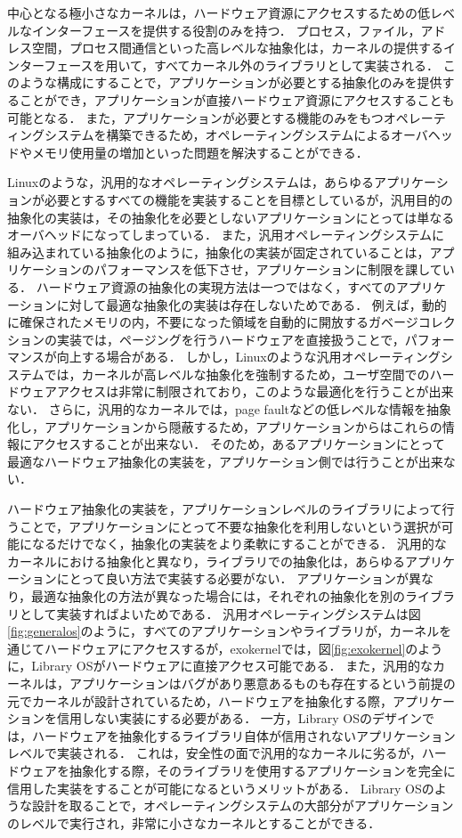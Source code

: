 \documentclass[graduation-thesis]{mlarticle}
\begin{document}
中心となる極小さなカーネルは，ハードウェア資源にアクセスするための低レベルなインターフェースを提供する役割のみを持つ．
プロセス，ファイル，アドレス空間，プロセス間通信といった高レベルな抽象化は，カーネルの提供するインターフェースを用いて，すべてカーネル外のライブラリとして実装される．
このような構成にすることで，アプリケーションが必要とする抽象化のみを提供することができ，アプリケーションが直接ハードウェア資源にアクセスすることも可能となる．
また，アプリケーションが必要とする機能のみをもつオペレーティングシステムを構築できるため，オペレーティングシステムによるオーバヘッドやメモリ使用量の増加といった問題を解決することができる．

Linuxのような，汎用的なオペレーティングシステムは，あらゆるアプリケーションが必要とするすべての機能を実装することを目標としているが，汎用目的の抽象化の実装は，その抽象化を必要としないアプリケーションにとっては単なるオーバヘッドになってしまっている．
また，汎用オペレーティングシステムに組み込まれている抽象化のように，抽象化の実装が固定されていることは，アプリケーションのパフォーマンスを低下させ，アプリケーションに制限を課している．
ハードウェア資源の抽象化の実現方法は一つではなく，すべてのアプリケーションに対して最適な抽象化の実装は存在しないためである．
例えば，動的に確保されたメモリの内，不要になった領域を自動的に開放するガベージコレクションの実装では，ページングを行うハードウェアを直接扱うことで，パフォーマンスが向上する場合がある．
しかし，Linuxのような汎用オペレーティングシステムでは，カーネルが高レベルな抽象化を強制するため，ユーザ空間でのハードウェアアクセスは非常に制限されており，このような最適化を行うことが出来ない．
さらに，汎用的なカーネルでは，page faultなどの低レベルな情報を抽象化し，アプリケーションから隠蔽するため，アプリケーションからはこれらの情報にアクセスすることが出来ない．
そのため，あるアプリケーションにとって最適なハードウェア抽象化の実装を，アプリケーション側では行うことが出来ない．

ハードウェア抽象化の実装を，アプリケーションレベルのライブラリによって行うことで，アプリケーションにとって不要な抽象化を利用しないという選択が可能になるだけでなく，抽象化の実装をより柔軟にすることができる．
汎用的なカーネルにおける抽象化と異なり，ライブラリでの抽象化は，あらゆるアプリケーションにとって良い方法で実装する必要がない．
アプリケーションが異なり，最適な抽象化の方法が異なった場合には，それぞれの抽象化を別のライブラリとして実装すればよいためである．
汎用オペレーティングシステムは図\ref{fig:generalos}のように，すべてのアプリケーションやライブラリが，カーネルを通じてハードウェアにアクセスするが，exokernelでは，図\ref{fig:exokernel}のように，Library OSがハードウェアに直接アクセス可能である．
また，汎用的なカーネルは，アプリケーションはバグがあり悪意あるものも存在するという前提の元でカーネルが設計されているため，ハードウェアを抽象化する際，アプリケーションを信用しない実装にする必要がある．
一方，Library OSのデザインでは，ハードウェアを抽象化するライブラリ自体が信用されないアプリケーションレベルで実装される．
これは，安全性の面で汎用的なカーネルに劣るが，ハードウェアを抽象化する際，そのライブラリを使用するアプリケーションを完全に信用した実装をすることが可能になるというメリットがある．
Library OSのような設計を取ることで，オペレーティングシステムの大部分がアプリケーションのレベルで実行され，非常に小さなカーネルとすることができる．
\end{document}
